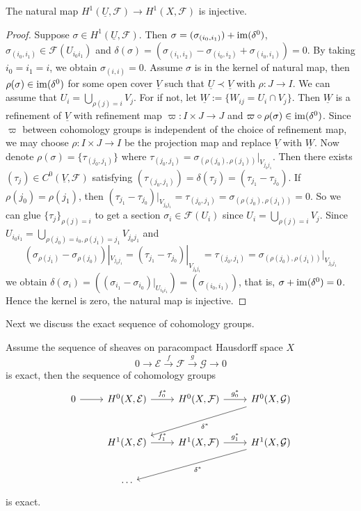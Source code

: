 \begin{prop}\label{H^1(U) to H^1(X)}
    The natural map $H^1(\underline{U},\mathcal{F})\to H^1(X,\mathcal{F})$ is injective.
\end{prop}
\begin{proof}
    Suppose $\sigma\in H^1(\underline{U},\mathcal{F})$.
    Then $\sigma=(\sigma_{(i_0,i_1)})+\operatorname{im}(\delta^0)$, $\sigma_{(i_0,i_1)}\in\mathcal{F}(U_{i_0i_1})$ and $\delta(\sigma)=(\sigma_{(i_1,i_2)}-\sigma_{(i_0,i_2)}+\sigma_{(i_0,i_1)})=0$.
    By taking $i_0=i_1=i$, we obtain $\sigma_{(i,i)}=0$.
    Assume $\sigma$ is in the kernel of natural map, then $\rho(\sigma)\in\operatorname{im}(\delta^0)$ for some open cover $\underline{V}$ such that $\underline{U}\prec\underline{V}$ with $\rho:J\to I$. 
    We can assume that $U_i=\bigcup_{\rho(j)=i}V_j$.
    For if not, let $\underline{W}:=\{W_{ij}=U_i\cap V_j\}$.
    Then $\underline{W}$ is a refinement of $\underline{V}$ with refinement map $\varpi:I\times J\to J$ and $\varpi\circ\rho(\sigma)\in\operatorname{im}(\delta^0)$.
    Since $\varpi$ between cohomology groups is independent of the choice of refinement map, we may choose $\rho:I\times J\to I$ be the projection map and replace $\underline{V}$ with $\underline{W}$.
    Now denote $\rho(\sigma)=\{\tau_{(j_0,j_1)}\}$ where $\tau_{(j_0,j_1)}=\sigma_{(\rho(j_0),\rho(j_1))}|_{V_{j_0j_1}}$.
    Then there exists $(\tau_j)\in C^0(\underline{V},\mathcal{F})$ satisfying $(\tau_{(j_0,j_1)})=\delta(\tau_j)=(\tau_{j_1}-\tau_{j_0})$.
    If $\rho(j_0)=\rho(j_1)$, then $(\tau_{j_1}-\tau_{j_0})|_{V_{j_0j_1}}=\tau_{(j_0,j_1)}=\sigma_{(\rho(j_0),\rho(j_1))}=0$.
    So we can glue $\{\tau_j\}_{\rho(j)=i}$ to get a section $\sigma_i\in\mathcal{F}(U_i)$ since $U_i=\bigcup_{\rho(j)=i}V_j$.
    Since $U_{i_0i_1}=\bigcup_{\rho(j_0)=i_0,\rho(j_1)=j_1}V_{j_0j_1}$ and 
    \[(\sigma_{\rho(j_1)}-\sigma_{\rho(j_0)})|_{V_{j_0j_1}}=(\tau_{j_1}-\tau_{j_0})|_{V_{j_0j_1}}=\tau_{(j_0,j_1)}=\sigma_{(\rho(j_0),\rho(j_1))}|_{V_{j_0j_1}}\]
    we obtain $\delta(\sigma_i)=((\sigma_{i_1}-\sigma_{i_0})|_{U_{i_0i_1}})=(\sigma_{(i_0,i_1)})$, that is, $\sigma+\operatorname{im}(\delta^0)=0$.
    Hence the kernel is zero, the natural map is injective.
\end{proof}

Next we discuss the exact sequence of cohomology groups.

\begin{thm}\label{exact cohomology groups}
    Assume the sequence of sheaves on paracompact Hausdorff space $X$
    \[0\to\mathcal{E}\xrightarrow{f}\mathcal{F}\xrightarrow{g}\mathcal{G}\to 0\]
    is exact, then the sequence of cohomology groups
    \[\begin{tikzcd}
        0 \ar[r] & H^0(X,\mathcal{E}) \ar[r, "f_0^*"] & H^0(X,\mathcal{F}) \ar[r, "g_0^*"] & H^0(X,\mathcal{G}) \ar[dll, "\delta^*"] \\[3mm]
        {} & H^1(X,\mathcal{E}) \ar[r, "f_1^*"] & H^1(X,\mathcal{F}) \ar[r, "g_1^*"] & H^1(X,\mathcal{G}) \ar[dll, "\delta^*"] \\[3mm]
        {} & \cdots & {} & {}
    \end{tikzcd}\]
    is exact.
\end{thm}

